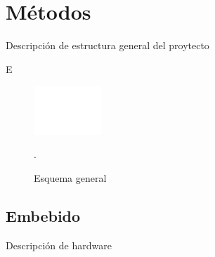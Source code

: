 \documentclass[journal]{IEEEtran}
\begin{document}








\section{Métodos}

Descripción de estructura general del proytecto
\newline 

{\color{blue}E}

\begin{figure}[!h]
	\centering
	\includegraphics[width=1in]{Esquema general.png}
	\caption{Esquema general}.
	\label{estructura_general}
\end{figure}

\subsection{Embebido}

Descripción de hardware
\end{document}
